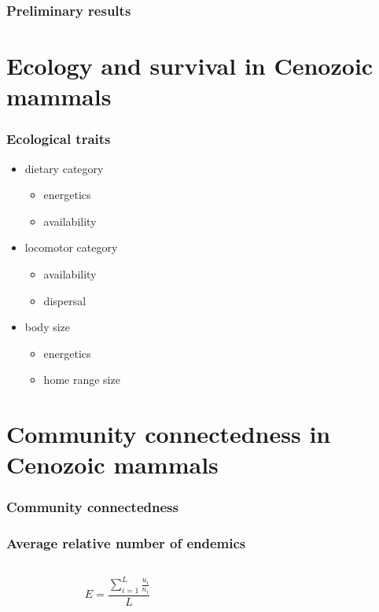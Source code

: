 \documentclass{beamer}
\begin{document}
\begin{frame}
  \frametitle{Preliminary results}
\end{frame}


\section{Ecology and survival in Cenozoic mammals}

\begin{frame}
  \frametitle{Ecological traits}
  \begin{itemize}
    \item dietary category
      \begin{itemize}
        \item energetics
        \item availability
      \end{itemize}
    \item locomotor category
      \begin{itemize}
        \item availability
        \item dispersal
      \end{itemize}
    \item body size
      \begin{itemize}
        \item energetics
        \item home range size
      \end{itemize}
  \end{itemize}
\end{frame}


\section{Community connectedness in Cenozoic mammals}

\begin{frame}
  \frametitle{Community connectedness}
\end{frame}

\begin{frame}
  \frametitle{Average relative number of endemics}

  \begin{columns}
    \begin{column}{0.5\textwidth}
      \begin{equation}
        E = \frac{\sum_{i = 1}^{L} \frac{u_{i}}{n_{i}}}{L}
        \label{eq:end}
      \end{equation}
    \end{column}
    \begin{column}{0.5\textwidth}
    \end{column}
  \end{columns}
\end{frame}
\end{document}
